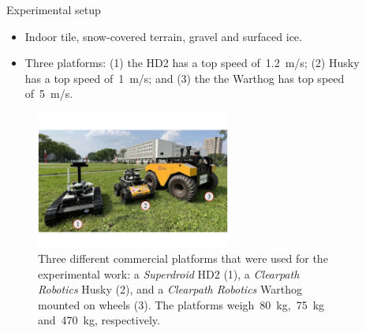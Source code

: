 \documentclass[final,hyperref={pdfpagelabels=false}]{beamer}
\begin{document}
\begin{frame}[t]
\begin{columns}[t]
\begin{column}{.465\textwidth}

\end{column} %

\begin{column}{.03\textwidth}\end{column} %
 
\begin{column}{.465\textwidth} %


\vspace{-12.5mm}
\begin{block}{Experimental setup}
	\begin{itemize}
		\item Indoor tile, snow-covered terrain, gravel and surfaced ice.
		\item Three platforms: (1) the HD2 has a top speed of~\SI{1.2}{\meter / \second}; (2) Husky has a top speed of~\SI{1}{\meter / \second}; and (3) the the Warthog has top speed of~\SI{5}{\meter / \second}.    
		
	\end{itemize}
	\begin{figure}%
		\begin{minipage}[b]{.34\textwidth}%
			\caption{
				Three different commercial platforms that were used for the experimental work:
				a \emph{Superdroid} HD2 (1), a \emph{Clearpath Robotics} Husky (2), and a \emph{Clearpath Robotics} Warthog mounted
				on wheels (3). 
				The platforms weigh~\SI{80}{\kilo\gram},~\SI{75}{\kilo\gram} and~\SI{470}{\kilo\gram}, respectively.
			}
		\end{minipage}%
		\hfill
		\includegraphics[width=0.63\textwidth]{./figures/norlab_robots_with_labels.pdf}
	\end{figure}
\end{block}



\end{column}
\end{columns}
\end{frame}
\end{document}
